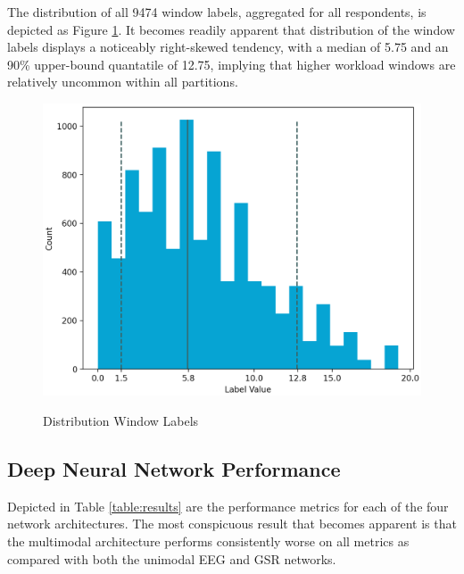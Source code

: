 \documentclass[12pt]{article}
\begin{document}
The distribution of all 9474 window labels, aggregated for all respondents,  is depicted as Figure \ref{fig:labels}. It becomes readily apparent that distribution of the window labels displays a noticeably right-skewed tendency, with a median of 5.75 and an 90\% upper-bound quantatile of 12.75, implying that higher workload windows are relatively uncommon within all partitions.  
\vspace{0.1cm}

\begin{figure}[h]
\caption{Distribution Window Labels}
\includegraphics[scale=0.39]{labels.png}
\label{fig:labels}
\end{figure}

\subsection{Deep Neural Network Performance}
Depicted in Table \ref{table:results} are the performance metrics for each of the four network architectures. The most conspicuous result that becomes apparent is that the multimodal architecture performs consistently worse on all metrics as compared with both the unimodal EEG and GSR networks.
\end{document}
